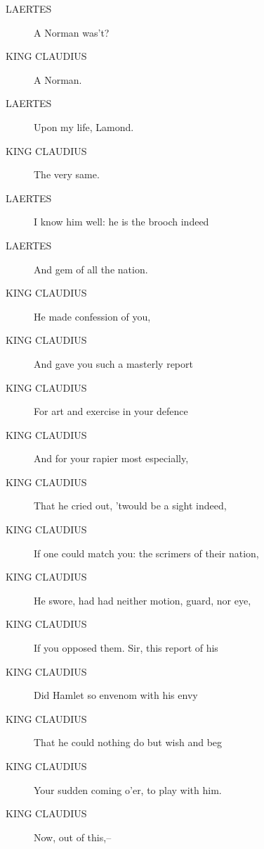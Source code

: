 \documentclass{article}
\begin{document}
\begin{description}
            
\item[LAERTES] A Norman was't?
\end{description}
          
\begin{description}
            
\item[KING CLAUDIUS] A Norman.
\end{description}
          
\begin{description}
            
\item[LAERTES] Upon my life, Lamond.
\end{description}
          
\begin{description}
            
\item[KING CLAUDIUS] The very same.
\end{description}
          
\begin{description}
            
\item[LAERTES] I know him well: he is the brooch indeed
\item[LAERTES] And gem of all the nation.
\end{description}
          
\begin{description}
            
\item[KING CLAUDIUS] He made confession of you,
\item[KING CLAUDIUS] And gave you such a masterly report
\item[KING CLAUDIUS] For art and exercise in your defence
\item[KING CLAUDIUS] And for your rapier most especially,
\item[KING CLAUDIUS] That he cried out, 'twould be a sight indeed,
\item[KING CLAUDIUS] If one could match you: the scrimers of their nation,
\item[KING CLAUDIUS] He swore, had had neither motion, guard, nor eye,
\item[KING CLAUDIUS] If you opposed them. Sir, this report of his
\item[KING CLAUDIUS] Did Hamlet so envenom with his envy
\item[KING CLAUDIUS] That he could nothing do but wish and beg
\item[KING CLAUDIUS] Your sudden coming o'er, to play with him.
\item[KING CLAUDIUS] Now, out of this,--
\end{description}
          
\end{document}
